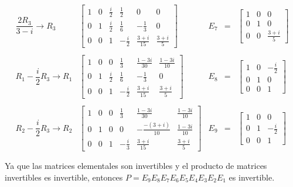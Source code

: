 \begin{enumerate}[\bfseries 1.]
	$$
	\begin{array}{rlrcl}
	    \dfrac{2R_3}{3-i} \to R_3 &
	    \left[
		\begin{array}{rrr|rrr}
		    1 & 0 & \frac{i}{2} &  \frac{1}{2} & 0 & 0 \\
		    0 & 1 & \frac{i}{2} &  \frac{1}{6} & -\frac{1}{3} & 0 \\
		    0 & 0 & 1 &  -\frac{i}{2} & \frac{3+i}{15} & \frac{3+i}{5}
		\end{array}
	    \right]
	    &E_7&=&
	    \left[
		\begin{array}{rrr}
		    1&0&0\\
		    0&1&0\\
		    0&0&\frac{3+i}{5}
		\end{array}
	    \right]\\\\
	    R_1-\dfrac{i}{2}R_3\to R_1&
	    \left[
		\begin{array}{rrr|rrr}
		    1 & 0 & 0 &  \frac{1}{3} & \frac{1-3i}{30} & \frac{1-3i}{10} \\
		    0 & 1 & \frac{i}{2} &  \frac{1}{6} & -\frac{1}{3} & 0 \\
		    0 & 0 & 1 &  -\frac{i}{2} & \frac{3+i}{15} & \frac{3+i}{5}
		\end{array}
	    \right]
	    &E_8&=&
	    \left[
		\begin{array}{rrr}
		    1 & 0 & -\frac{i}{2}\\
		    0 & 1 & 0\\
		    0 & 0 & 1
		\end{array}
	    \right]\\\\
	    R_2-\dfrac{i}{2}R_3\to R_2&
	    \left[
		\begin{array}{rrr|rrr}
		    1 & 0 & 0 & \frac{1}{3} & \frac{1-3i}{30} & \frac{1-3i}{10} \\
		    0 & 1 & 0 & 0 & -\frac{-(3+i)}{10} & \frac{1-3i}{10} \\
		    0 & 0 & 1 & -\frac{i}{3} & \frac{3+i}{15} & \frac{3+i}{5}
		\end{array}
	    \right]
	    &E_9&=&
	    \left[
		\begin{array}{rrr}
		    1 & 0 & 0\\
		    0 & 1 & -\frac{i}{2}\\
		    0 & 0 & 1
		\end{array}
	    \right]\\\\
	\end{array}
	$$
	Ya que las matrices elementales son invertibles y el producto de matrices invertibles es invertible, entonces $P=E_9E_8 E_7 E_6 E_5 E_4 E_3 E_2 E_1$ es invertible.

\end{enumerate}
